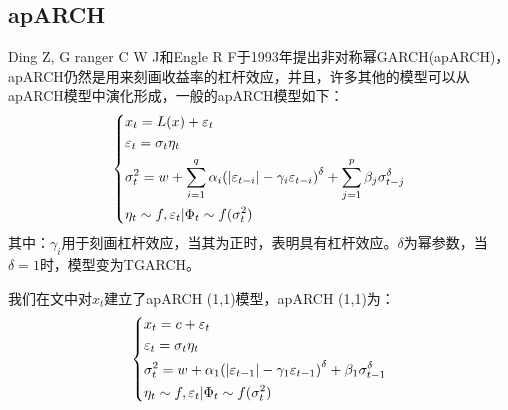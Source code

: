     \subsection{apARCH}
        Ding Z, G ranger C W J和Engle R F于1993年提出非对称幂GARCH(apARCH)，apARCH仍然是用来刻画收益率的杠杆效应，并且，许多其他的模型可以从apARCH模型中演化形成，一般的apARCH模型如下：
        \begin{equation*}
        \centering
        \left\{\begin{lgathered}
        {x_t} = L(x) + {\varepsilon _t}\\
        {\varepsilon _t} = {\sigma _t}{\eta _t}\\
        \sigma _t^2 = w + \sum\limits_{i = 1}^q {{\alpha _i}{{\left( {\left| {{\varepsilon _{t - i}}} \right| - {\gamma _i}{\varepsilon _{t - i}}} \right)}^\delta }}  + \sum\limits_{j = 1}^p {{\beta _j}\sigma _{t - j}^\delta } \\
        {\eta _t} \sim f,{\varepsilon _t}|{\Phi _t} \sim f(\sigma _t^2)
         \end{lgathered} \right.
         \end{equation*}
        其中：$\gamma_i$用于刻画杠杆效应，当其为正时，表明具有杠杆效应。$\delta$为幂参数，当$\delta=1$时，模型变为TGARCH。
        \par
        我们在文中对$x_t$建立了apARCH (1,1)模型，apARCH (1,1)为：
        \begin{equation*}
        \centering
        \left\{\begin{lgathered}
        {x_t} = c + {\varepsilon _t}\\
        {\varepsilon _t} = {\sigma _t}{\eta _t}\\
        \sigma _t^2 = w + {\alpha _1}{\left( {\left| {{\varepsilon _{t - 1}}} \right| - {\gamma _1}{\varepsilon _{t - 1}}} \right)^\delta } + {\beta _1}\sigma _{t - 1}^\delta \\
        {\eta _t} \sim f,{\varepsilon _t}|{\Phi _t} \sim f(\sigma _t^2)
         \end{lgathered} \right.
         \end{equation*}
